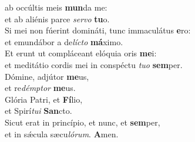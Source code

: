 \oddverse  ab occúltis meis \textbf{mun}da me:~\*\\
\oddverse et ab aliénis parce \textit{ser}\textit{vo} \textbf{tu}o.\\
\evenverse Si mei non fúerint domináti, tunc immaculátus \textbf{e}ro:~\*\\
\evenverse et emundábor a de\textit{lí}\textit{cto} \textbf{má}ximo.\\
\oddverse Et erunt ut compláceant elóquia oris \textbf{me}i:~\*\\
\oddverse et meditátio cordis mei in conspéctu \textit{tu}\textit{o} \textbf{sem}per.\\
\evenverse Dómine, adjútor \textbf{me}us,~\*\\
\evenverse et re\textit{dém}\textit{ptor} \textbf{me}us.\\
\oddverse Glória Patri, et \textbf{Fí}lio,~\*\\
\oddverse et Spirí\textit{tu}\textit{i} \textbf{San}cto.\\
\evenverse Sicut erat in princípio, et nunc, et \textbf{sem}per,~\*\\
\evenverse et in sǽcula sæcu\textit{ló}\textit{rum}. \textbf{A}men.\\
